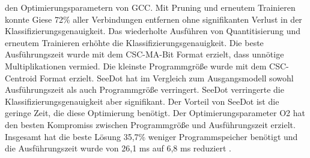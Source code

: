 den Optimierungsparametern von GCC. Mit Pruning und erneutem Trainieren konnte Giese 72\% aller Verbindungen entfernen ohne signifikanten Verlust in der Klassifizierungsgenauigkeit. Das wiederholte Ausführen von Quantitisierung und
erneutem Trainieren erhöhte die Klassifizierungsgenauigkeit. Die beste Ausführungszeit wurde mit dem CSC-MA-Bit Format erzielt, dass unnötige Multiplikationen vermied. Die kleinste Programmgröße wurde mit dem
CSC-Centroid Format erzielt. SeeDot hat im Vergleich zum Ausgangsmodell sowohl Ausführungszeit als auch Programmgröße verringert. SeeDot verringerte die Klassifizierungsgenauigkeit aber signifikant. Der Vorteil von SeeDot
ist die geringe Zeit, die diese Optimierung benötigt. Der Optimierungsparameter O2 hat den besten Kompromiss zwischen Programmgröße und Ausführungszeit erzielt. Insgesamt hat die beste Lösung 35,7\% weniger Programmspeicher
benötigt und die Ausführungszeit wurde von 26,1 ms auf 6,8 ms reduziert \cite{gieseThesis}.